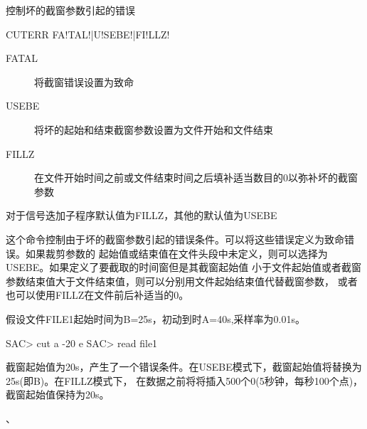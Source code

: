 \label{cmd:cuterr}

控制坏的截窗参数引起的错误

\begin{SACSTX}
CUTERR FA!TAL!|U!SEBE!|FI!LLZ!
\end{SACSTX}

\begin{description}
\item [FATAL] 将截窗错误设置为致命
\item [USEBE] 将坏的起始和结束截窗参数设置为文件开始和文件结束 
\item [FILLZ] 在文件开始时间之前或文件结束时间之后填补适当数目的0以弥补坏的截窗参数
\end{description}

对于信号迭加子程序默认值为FILLZ，其他的默认值为USEBE

这个命令控制由于坏的截窗参数引起的错误条件。可以将这些错误定义为致命错误。如果裁剪参数的
起始值或结束值在文件头段中未定义，则可以选择为USEBE。如果定义了要截取的时间窗但是其截窗起始值
小于文件起始值或者截窗参数结束值大于文件结束值，则可以分别用文件起始结束值代替截窗参数，
或者也可以使用FILLZ在文件前后补适当的0。

假设文件FILE1起始时间为B=25s，初动到时A=40s,采样率为0.01s。
\begin{SACCode}
SAC> cut a -20 e
SAC> read file1
\end{SACCode}
截窗起始值为20s，产生了一个错误条件。在USEBE模式下，截窗起始值将替换为25s(即B)。在FILLZ模式下，
在数据之前将将插入500个0(5秒钟，每秒100个点)，截窗起始值保持为20s。

、
